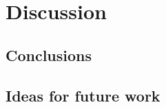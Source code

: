 \chapter{Discussion}
\label{chapter4}

\section{Conclusions}
\lipsum[13]

\section{Ideas for future work}
\lipsum[14]

